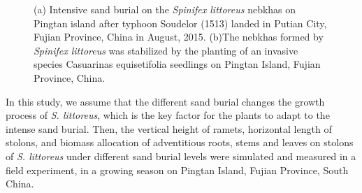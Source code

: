 \documentclass[]{interact}
\theoremstyle{plain}%
\theoremstyle{definition}
\theoremstyle{remark}
\begin{document}
\begin{figure}
  \centering
  \hspace{5pt}
  \caption{(a) Intensive sand burial on the \textit{Spinifex littoreus} nebkhas on Pingtan island after typhoon Soudelor (1513) landed in Putian City, Fujian Province, China in August, 2015. (b)The nebkhas formed by \textit{Spinifex littoreus} was stabilized by the planting of an invasive species Casuarinas equisetifolia seedlings on Pingtan Island, Fujian Province, China.} 
  \label{sample-pic}
\end{figure}

\label{Introduction-5}
In this study, we assume that the different sand burial changes the growth process of \textit{S. littoreus}, which is the key factor for the plants to adapt to the intense sand burial. Then, the vertical height of ramets, horizontal length of stolons, and biomass allocation of adventitious roots, stems and leaves on stolons of \textit{S. littoreus} under different sand burial levels were simulated and measured in a field experiment, in a growing season on Pingtan Island, Fujian Province, South China.
\end{document}
